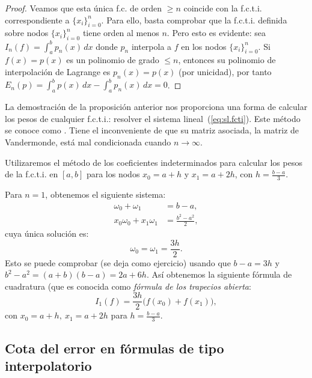 \begin{proof}
   Veamos que esta única f.c. de orden $\ge n$ coincide con
  la f.c.t.i. correspondiente a $\{x_i\}_{i=0}^n$. Para ello, basta
  comprobar que la f.c.t.i. definida sobre nodos $\{x_i\}_{i=0}^n$
  tiene orden al menos $n$.
  Pero esto es evidente: sea $I_n(f)=\int_a^b p_n(x)\, dx$ donde $p_n$
  interpola a $f$ en los nodos $\{x_i\}_{i=0}^n$. Si $f(x)=p(x)$ es un
  polinomio de grado $\le n$, entonces su polinomio de interpolación
  de Lagrange es $p_n(x)=p(x)$ (por unicidad), por tanto
  $E_n(p)=\int_a^b p(x)\,dx - \int_a^b p_n(x)\,dx =0$.
\end{proof}

\begin{remark}
  \label{rk:6}
  La demostración de la proposición anterior nos proporciona una forma
  de calcular los pesos de cualquier f.c.t.i.: resolver el sistema
lineal~(\ref{eq:sl.fcti}). Este método se conoce como . Tiene el inconveniente de que su
matriz asociada, la matriz de Vandermonde, está mal condicionada
  cuando $n\to\infty$.
\end{remark}

\begin{example}
  \label{ex:coef-indetermin:formula-trapecios-abierta}
  Utilizaremos el método de los coeficientes indeterminados para
  calcular los pesos de la f.c.t.i. en $[a,b]$ para los nodos
  $x_0=a+h$ y $x_1=a+2h$, con $h=\frac{b-a}{3}$.

  Para $n=1$, obtenemos el siguiente sistema:
  \begin{align*}
    \omega_0 + \omega_1 &= b-a,
    \\
    x_0\omega_0 + x_1\omega_1 &= \frac{b^2-a^2}{2},
  \end{align*}
  cuya única solución es:
  \begin{equation*}
    \omega_0=\omega_1=\frac{3h}{2}.
  \end{equation*}
  Esto se puede comprobar (se deja como ejercicio) usando
  que $b-a=3h$ y $b^2-a^2 = (a+b)(b-a)=2a + 6h$.
  Así obtenemos la siguiente fórmula de cuadratura (que es conocida
  como \textit{fórmula de los trapecios abierta}:
  \begin{equation*}
    I_1(f)=\frac{3h}{2}
    \big(
      f(x_0)+f(x_1)
    \big),
  \end{equation*}
  con $x_0=a+h, \ x_1=a+2h$ para $h=\frac{b-a}{3}$.
\end{example}

\subsection*{Cota del error en fórmulas de tipo interpolatorio}

